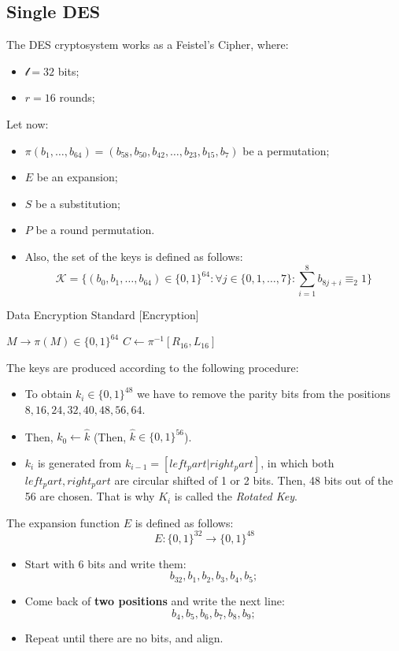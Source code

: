 \subsection{Single DES}
The DES cryptosystem works as a Feistel's Cipher, where:
\begin{itemize}
    \item $\mathcal{l} = 32$ bits;
    \item $r = 16$ rounds;
\end{itemize}
Let now:
\begin{itemize}
    \item $\pi(b_{1}, \dots, b_{64}) = (b_{58}, b_{50}, b_{42}, \dots, b_{23}, b_{15}, b_{7})$ be a permutation;
    \item $E$ be an expansion;
    \item $S$ be a substitution;
    \item $P$ be a round permutation.
    \item Also, the set of the keys is defined as follows:
    \[\mathcal{K} = \{(b_{0}, b_{1}, \dots, b_{64}) \in \{0,1\}^{64}: \forall j \in \{0, 1, \dots,7\}: \sum_{i=1}^{8} b_{8j + i} \equiv_{2} 1\}\]
\end{itemize}

\begin{algorithm}
\caption{Data Encryption Standard [Encryption]}\label{alg:DES_encrypt}
$M \rightarrow \pi(M) \in \{0,1\}^{64}$\;
$C \gets \pi^{-1}[R_{16}, L_{16}]$\;
\end{algorithm}
The keys are produced according to the following procedure:
\begin{itemize}
    \item To obtain $k_{i} \in \{0,1\}^{48}$ we have to remove the parity bits from the positions $8, 16, 24, 32, 40, 48, 56, 64$.
    \item Then, $k_{0} \gets \hat{k}$ (Then, $\hat{k} \in \{0,1\}^{56}$).
    \item $k_{i}$ is generated from $k_{i-1} = [left_part | right_part]$, in which both $left_part, right_part$ are circular shifted of 1 or 2 bits. Then, 48 bits out of the 56 are chosen. That is why $K_{i}$ is called the \emph{Rotated Key}.
\end{itemize}

The expansion function $E$ is defined as follows:
\[E: \{0,1\}^{32} \rightarrow \{0,1\}^{48}\]
\begin{itemize}
    \item Start with 6 bits and write them:
    \[b_{32}, b_{1}, b_{2}, b_{3}, b_{4}, b_{5};\]
    \item Come back of \textbf{two positions} and write the next line:
    \[b_{4}, b_{5}, b_{6}, b_{7}, b_{8}, b_{9};\]
    \item Repeat until there are no bits, and align.
\end{itemize}

